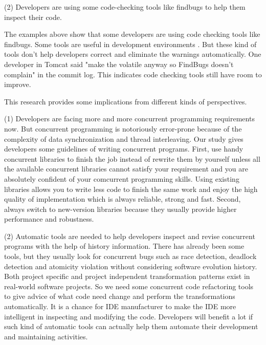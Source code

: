\documentclass[conference]{IEEEtran}
\begin{document}
(2) Developers are using some code-checking tools like findbugs to help them inspect their code.

The examples above show that some developers are using code checking tools like findbugs. Some tools are useful in development environments \cite{conf/oopsla/AyewahPMPZ07}. But these kind of tools don't help developers correct and eliminate the warnings automatically. One developer in Tomcat said "make the volatile anyway so FindBugs doesn't complain" in the commit log. This indicates code checking tools still have room to improve.

This research provides some implications from different kinds of perspectives.

(1) Developers are facing more and more concurrent programming requirements now. But concurrent programming is notoriously error-prone because of the complexity of data synchronization and thread interleaving. Our study gives developers some guidelines of writing concurrent programs. First, use handy concurrent libraries to finish the job instead of rewrite them by yourself unless all the available concurrent libraries cannot satisfy your requirement and you are absolutely confident of your comcurrent programming skills. Using existing libraries allows you to  write less code to finish the same work and enjoy the high quality of implementation which is always reliable, strong and fast. Second, always switch to new-version libraries because they usually provide higher performance and robustness.

(2) Automatic tools are needed to help developers inspect and revise concurrent programs with the help of history information. There has already been some tools, but they usually look for concurrent bugs such as race detection, deadlock detection and atomicity violation without considering software evolution history. Both project specific and project independent transformation patterns exist in real-world software projects. So we need some concurrent code refactoring tools to give advice of what code need change and perform the transformations automatically. It is a chance for IDE manufacturer to make the IDE more intelligent in inspecting and modifying the code. Developers will benefit a lot if such kind of automatic tools can actually help them automate their development and maintaining activities.

\end{document}
